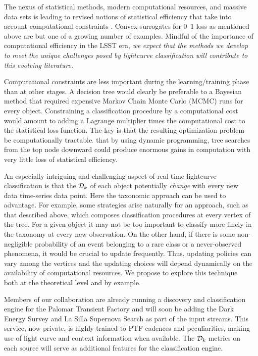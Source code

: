 The nexus of statistical methods, modern computational resources, and massive data sets is leading to revised notions of statistical efficiency that take into account computational constraints \citep{MeinBickRice2008}.  Convex surrogates for 0--1 loss as mentioned above are but one of a growing number of examples.  Mindful of the importance of computational efficiency in the LSST era, {\it  we expect that the methods we develop to meet the unique challenges posed by lightcurve classification will contribute to this evolving literature.} 

Computational constraints are less important during the learning/training phase than at other stages.  A decision tree would clearly be preferable to a Bayesian method that required expensive Markov Chain Monte Carlo (MCMC) runs for every object. Constraining a classification procedure by a computational cost would amount to adding a Lagrange multiplier times the computational cost to the statistical loss function.  The key is that the resulting optimization problem be computationally tractable.   \citet{MeinBickRice2008} that by using dynamic programming,  tree searches from the top node downward  could produce enormous gains in computation with very little loss of statistical efficiency.

An especially intriguing and challenging aspect of  real-time lightcurve classification is that the ${\cal D}_k$ of each object potentially
\emph{change} with every new data time-series data point. Here the taxonomic approach can be used to advantage. For example, some strategies arise naturally for an approach, such as that described above, which composes classification procedures at every vertex of the tree. For a given object it may not be too important to classify more finely in the taxonomy at every new observation.  On the other hand, if there is some non-negligible probability of an event belonging to a rare class or a never-observed phenomena, it would be crucial to update frequently.  Thus, updating policies can vary among the vertices and the updating choices will depend dynamically on the availability of computational resources. We propose to explore this technique both at the theoretical level and by example.

 \smallskip

Members of our collaboration are already running a discovery and classification engine for the Palomar Transient Factory and will soon be adding the Dark Energy Survey and La Silla Supernova Search as part of the input streams.  This service, now private, is highly trained to PTF cadences and peculiarities, making use of light curve and context information when available. The ${\cal D}_k$ metrics on each source will serve as additional features for the classification engine.

